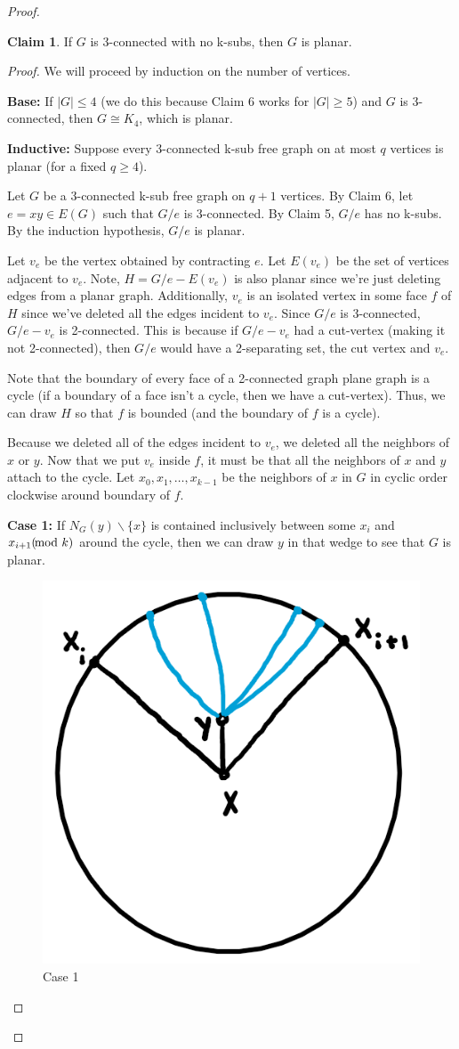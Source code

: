 \documentclass[12pt]{article}
\theoremstyle{definition}
\newtheorem{claim}{Claim}
\begin{document}
\begin{proof}
    \begin{greenbox}
        \begin{claim}
            If $G$ is 3-connected with no k-subs, then $G$ is planar.
        \end{claim}
    \end{greenbox}

    \begin{proof}
        We will proceed by induction on the number of vertices.

        \textbf{Base: }If $|G| \leq 4$ (we do this because Claim 6 works for $|G| \geq 5$) and $G$ is 3-connected, then $G \cong K_4$, which is planar.

        \textbf{Inductive: }Suppose every 3-connected k-sub free graph on at most $q$ vertices is planar (for a  fixed $q \geq 4$).

        Let $G$ be a 3-connected k-sub free graph on $q + 1$ vertices. By Claim 6, let $e = xy \in E(G)$ such that $G / e$ is 3-connected. By Claim 5, $G /e$ has no k-subs. By the induction hypothesis, $G / e$ is planar.

        Let $v_e$ be the vertex obtained by contracting $e$. Let $E(v_e)$ be the set of vertices adjacent to $v_e$. Note, $H = G/e - E(v_e)$ is also planar since we're just deleting edges from a planar graph. Additionally, $v_e$ is an isolated vertex in some face $f$ of $H$ since we've deleted all the edges incident to $v_e$. Since $G / e$ is 3-connected, $G / e - v_e$ is 2-connected. This is because if $G / e - v_e$ had a cut-vertex (making it not 2-connected), then $G / e$ would have a 2-separating set, the cut vertex and $v_e$.

        Note that the boundary of every face of a 2-connected graph plane graph is a cycle (if a boundary of a face isn't a cycle, then we have a cut-vertex). Thus, we can draw $H$ so that $f$ is bounded (and the boundary of $f$ is a cycle).

        Because we deleted all of the edges incident to $v_e$, we deleted all the neighbors of $x$ or $y$. Now that we put $v_e$ inside $f$, it must be that all the neighbors of $x$ and $y$ attach to the cycle. Let $x_0, x_1, \ldots, x_{k-1}$ be the neighbors of $x$ in $G$  in cyclic order clockwise around boundary of $f$.

        \textbf{Case 1: }If $N_G(y) \backslash \{x\}$ is contained inclusively between some $x_i$ and $x_{i+1} (\hspace{-8pt}\mod k)$ around the cycle, then we can draw $y$ in that wedge to see that $G$ is planar.
        \begin{figure}[hbt!]
            \centering
            \includegraphics[width=0.3\linewidth]{graphs/claim_7_1.png}
            \caption{Case 1}
        \end{figure}


\end{proof}
\end{proof}
\end{document}
